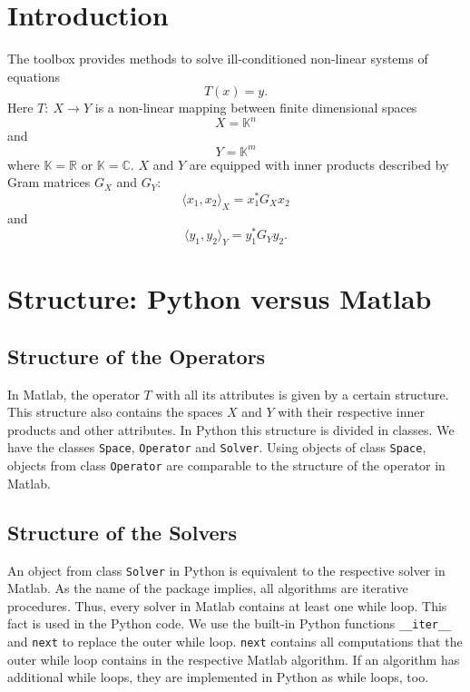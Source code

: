\documentclass[12pt]{scrartcl}
\begin{document}
\newpage
\thispagestyle{empty}
\tableofcontents

\newpage
{}
\section{Introduction}
The toolbox provides methods to solve ill-conditioned non-linear systems of equations
$$T(x) = y.$$
Here  $T:~X \rightarrow Y$ is a non-linear mapping between finite dimensional spaces 
$$X = \mathbb{K}^n$$
and
$$Y = \mathbb{K}^m$$
where  $\mathbb{K}=\mathbb{R}$ or  $\mathbb{K}=\mathbb{C}$. $X$ and  $Y$ are equipped with inner products described by Gram matrices  $G_X$ and  $G_Y$:
$$\langle x_1,x_2 \rangle_X = x_1^\ast G_X x_2$$
and
$$\langle y_1,y_2 \rangle_Y = y_1^\ast G_Y y_2.$$
\section{Structure: Python versus Matlab}
\subsection{Structure of the Operators}
In Matlab, the operator $T$ with all its attributes is given by a certain structure. This structure also contains the spaces $X$ and $Y$ with their respective inner products and other attributes. In Python this structure is divided in classes. We have the classes \texttt{Space}, \texttt{Operator} and \texttt{Solver}. Using objects of class \texttt{Space}, objects from class \texttt{Operator} are comparable to the structure of the operator in Matlab.
\subsection{Structure of the Solvers}
An object from class \texttt{Solver} in Python is equivalent to the respective solver in Matlab. As the name of the package implies, all algorithms are iterative procedures. Thus, every solver in Matlab contains at least one while loop. This fact is used in the Python code. We use the built-in Python functions \verb|__iter__| and \texttt{next} to replace the outer while loop. \texttt{next} contains all computations that the outer while loop contains in the respective Matlab algorithm. If an algorithm has additional while loops, they are implemented in Python as while loops, too.
\end{document}
